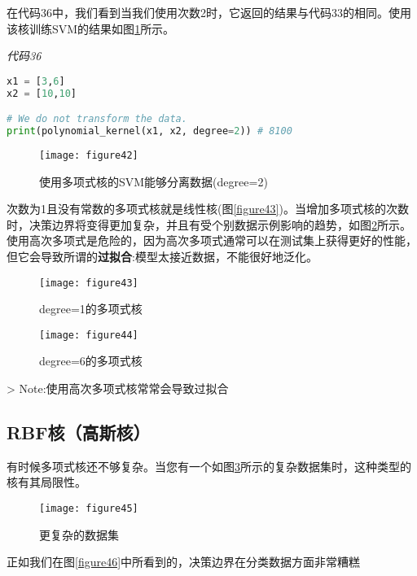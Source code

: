 在代码36中，我们看到当我们使用次数2时，它返回的结果与代码33的相同。使用该核训练SVM的结果如图\ref{figure42}所示。

\emph{代码36}

\begin{lstlisting}[language=python]
x1 = [3,6] 
x2 = [10,10] 

# We do not transform the data. 
print(polynomial_kernel(x1, x2, degree=2)) # 8100
\end{lstlisting}

\begin{figure}[ht]
	\centering
	\texttt{[image: figure42]}
	\caption{使用多项式核的SVM能够分离数据(degree=2)}
	\label{figure42}
\end{figure}

次数为1且没有常数的多项式核就是线性核(图\ref{figure43})。当增加多项式核的次数时，决策边界将变得更加复杂，并且有受个别数据示例影响的趋势，如图\ref{figure44}所示。使用高次多项式是危险的，因为高次多项式通常可以在测试集上获得更好的性能，但它会导致所谓的\textbf{过拟合}:模型太接近数据，不能很好地泛化。


\begin{figure}[ht]
	
    \begin{minipage}{.4\linewidth}
        \centering
	    \texttt{[image: figure43]}
	    \caption{degree=1的多项式核}
	    \label{figure43}
    \end{minipage}
    \begin{minipage}{.4\linewidth}
    	\centering
	    \texttt{[image: figure44]}
	    \caption{degree=6的多项式核}
	    \label{figure44}
    \end{minipage}
\end{figure}


> Note:使用高次多项式核常常会导致过拟合

\subsection{RBF核（高斯核）}

有时候多项式核还不够复杂。当您有一个如图\ref{figure45}所示的复杂数据集时，这种类型的核有其局限性。

\begin{figure}[ht]
	\centering
	\texttt{[image: figure45]}
	\caption{更复杂的数据集}
	\label{figure45}
\end{figure}

正如我们在图\ref{figure46}中所看到的，决策边界在分类数据方面非常糟糕


